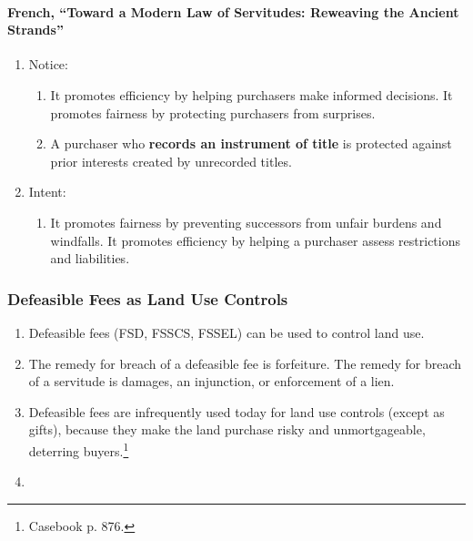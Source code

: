 \paragraph{French, ``Toward a Modern Law of Servitudes: Reweaving the Ancient 
Strands''}

\begin{enumerate}
    \item Notice:
    \begin{enumerate}
        \item It promotes efficiency by helping purchasers make informed 
        decisions. It promotes fairness by protecting purchasers from 
        surprises.
        \item A purchaser who \textbf{records an instrument of title} is 
        protected against prior interests created by unrecorded titles.
    \end{enumerate}
    \item Intent:
    \begin{enumerate}
        \item It promotes fairness by preventing successors from unfair 
        burdens and windfalls. It promotes efficiency by helping a purchaser 
        assess restrictions and liabilities.
    \end{enumerate}
\end{enumerate}

\subsubsection{Defeasible Fees as Land Use Controls}

\begin{enumerate}
    \item Defeasible fees (FSD, FSSCS, FSSEL) can be used to control land use.
    \item The remedy for breach of a defeasible fee is forfeiture. The remedy 
    for breach of a servitude is damages, an injunction, or enforcement of a 
    lien.
    \item Defeasible fees are infrequently used today for land use controls 
    (except as gifts), because they make the land purchase risky and 
    unmortgageable, deterring buyers.\footnote{Casebook p. 876.}
    \item %
\end{enumerate}

